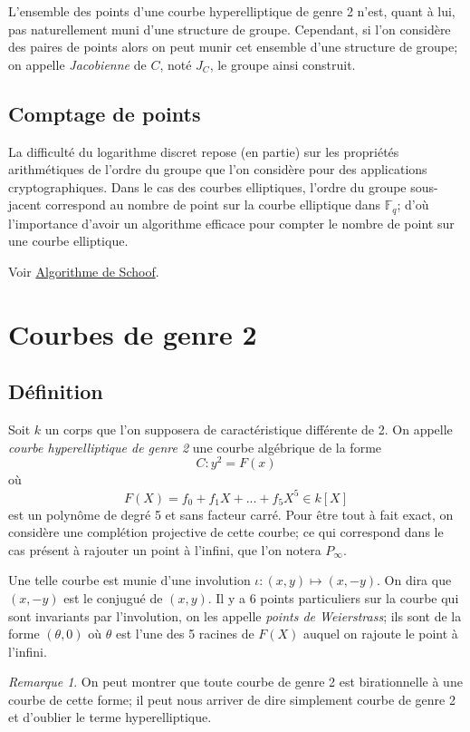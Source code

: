 \documentclass[a4paper]{article}
\theoremstyle{definition}
\theoremstyle{remark}
\newtheorem{remarque}{Remarque}
\numberwithin{equation}{section}
\begin{document}
L'ensemble des points d'une courbe hyperelliptique de genre 2 n'est, quant à lui, pas naturellement muni d'une structure de groupe. Cependant, si l'on considère des paires de points alors on peut munir cet ensemble d'une structure de groupe; on appelle \emph{Jacobienne} de $C$, noté $J_C$, le groupe ainsi construit.

\subsection{Comptage de points}
La difficulté du logarithme discret repose (en partie) sur les propriétés arithmétiques de l'ordre du groupe que l'on considère pour des applications cryptographiques. Dans le cas des courbes elliptiques, l'ordre du groupe sous-jacent correspond au nombre de point sur la courbe elliptique dans $\mathbb{F}_q$; d'où l'importance d'avoir un algorithme efficace pour compter le nombre de point sur une courbe elliptique.

Voir \hyperref[algoSchoof]{Algorithme de Schoof}.

\section{Courbes de genre 2}

\subsection{Définition}
Soit $k$ un corps que l'on supposera de caractéristique différente de 2.
On appelle \emph{courbe hyperelliptique de genre 2} une courbe algébrique de la forme
$$C : y^2 = F(x)$$
où $$F(X) = f_0 + f_1X + ... + f_5X^5 \in k[X]$$
est un polynôme de degré 5 et sans facteur carré. Pour être tout à fait exact, on considère une complétion projective de cette courbe; ce qui correspond dans le cas présent à rajouter un point à l'infini, que l'on notera $P_\infty$.

Une telle courbe est munie d'une involution $\iota : (x,y) \longmapsto (x,-y)$. On dira que $(x,-y)$ est le conjugué de $(x,y)$. Il y a 6 points particuliers sur la courbe qui sont invariants par l'involution, on les appelle \emph{points de Weierstrass}; ils sont de la forme $(\theta,0)$ où $\theta$ est l'une des 5 racines de $F(X)$ auquel on rajoute le point à l'infini.

\begin{remarque}
On peut montrer que toute courbe de genre 2 est birationnelle à une courbe de cette forme; il peut nous arriver de dire simplement courbe de genre 2 et d'oublier le terme hyperelliptique.
\end{remarque}
\end{document}

